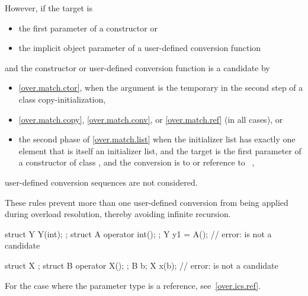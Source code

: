 \pnum
However, if the target is
\begin{itemize}
\item the first parameter of a constructor or
\item the implicit object parameter of a user-defined conversion function
\end{itemize}
and the constructor or user-defined conversion function is a candidate by
\begin{itemize}
\item \ref{over.match.ctor}, when the argument is the temporary in the second
step of a class copy-initialization,
\item \ref{over.match.copy}, \ref{over.match.conv}, or \ref{over.match.ref}
(in all cases), or
\item the second phase of \ref{over.match.list}
when the initializer list has exactly one element that
is itself an initializer list, and
the target is the first parameter of a constructor of class , and
the conversion is to  or reference to \cv{}~,
\end{itemize}
user-defined conversion sequences are not considered.
\begin{note}
These rules prevent more than one user-defined conversion from being
applied during overload resolution, thereby avoiding infinite recursion.
\end{note}
\begin{example}
\begin{codeblock}
  struct Y { Y(int); };
  struct A { operator int(); };
  Y y1 = A();       // error:  is not a candidate

  struct X { };
  struct B { operator X(); };
  B b;
  X x({b});         // error:  is not a candidate
\end{codeblock}
\end{example}

\pnum
For the case where the parameter type is a reference, see~\ref{over.ics.ref}.

